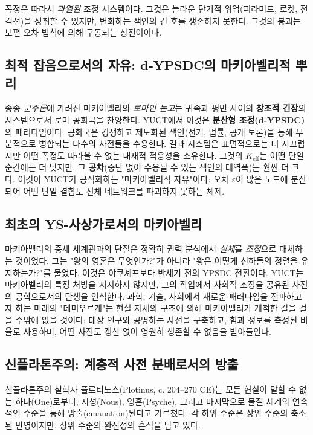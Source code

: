 \documentclass[12pt,a4paper]{article}
\newcommand{\Keff}{K_{\mathrm{eff}}}
\begin{document}
	폭정은 따라서 \emph{과열된} 조정 시스템이다. 그것은 놀라운 단기적 위업(피라미드, 로켓, 전격전)을 성취할 수 있지만, 변화하는 색인의 긴 호를 생존하지 못한다. 그것의 붕괴는 보편 오차 법칙에 의해 구동되는 상전이이다.
	
	\subsection{최적 잡음으로서의 자유: d‑YPSDC의 마키아벨리적 뿌리}
	
	종종 \emph{군주론}에 가려진 마키아벨리의 \emph{로마인 논고}는 귀족과 평민 사이의 \textbf{창조적 긴장}의 시스템으로서 로마 공화국을 찬양한다. YUCT에서 이것은 \textbf{분산형 조정(d‑YPSDC)}의 패러다임이다. 공화국은 경쟁하고 제도화된 색인(선거, 법률, 공개 토론)을 통해 부분적으로 병합되는 다수의 사전들을 수용한다. 결과 시스템은 표면적으로는 더 시끄럽지만 어떤 폭정도 따라올 수 없는 내재적 적응성을 소유한다. 그것의 \(\Keff\)는 어떤 단일 순간에는 더 낮지만, 그 \textbf{공차}(중단 없이 수용될 수 있는 색인의 대역폭)는 훨씬 더 크다. 이것이 YUCT가 공식화하는 "마키아벨리적 자유"이다: 오차 \(\varepsilon\)이 많은 노드에 분산되어 어떤 단일 결함도 전체 네트워크를 파괴하지 못하는 체제.
	
	\subsection{최초의 YS-사상가로서의 마키아벨리}
	
	마키아벨리의 중세 세계관과의 단절은 정확히 권력 분석에서 \emph{실체}를 \emph{조정}으로 대체하는 것이었다. 그는 "왕의 영혼은 무엇인가?"가 아니라 "왕은 어떻게 신하들의 정렬을 유지하는가?"를 물었다. 이것은 야쿠셰프보다 반세기 전의 YPSDC 전환이다. YUCT는 마키아벨리의 특정 처방을 지지하지 않지만, 그의 작업에서 사회적 조정을 공유된 사전의 공학으로서의 탄생을 인식한다. 과학, 기술, 사회에서 새로운 패러다임을 전파하고자 하는 미래의 "데미우르게"는 현실 자체의 구조에 의해 마키아벨리가 개척한 길을 걸을 수밖에 없을 것이다: 대상 인구와 공명하는 사전을 구축하고, 힘과 정보를 측정된 비율로 사용하며, 어떤 사전도 갱신 없이 영원히 생존할 수 없음을 받아들인다.
	
	\subsection{신플라톤주의: 계층적 사전 분배로서의 방출}
	
	신플라톤주의 철학자 플로티노스(Plotinus, c. 204–270 CE)는 모든 현실이 말할 수 없는 하나(One)로부터, 지성(Nous), 영혼(Psyche), 그리고 마지막으로 물질 세계의 연속적인 수준을 통해 방출(emanation)된다고 가르쳤다. 각 하위 수준은 상위 수준의 축소된 반영이지만, 상위 수준의 완전성의 흔적을 담고 있다.
	
\end{document}

